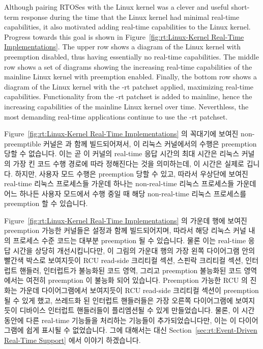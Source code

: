 Although pairing RTOSes with the Linux kernel was a clever and useful
short-term response during the time that the Linux kernel had minimal
real-time capabilities, it also motivated adding real-time capabilities
to the Linux kernel.
Progress towards this goal is shown in
Figure~\ref{fig:rt:Linux-Kernel Real-Time Implementations}.
The upper row shows a diagram of the Linux kernel with preemption disabled,
thus having essentially no real-time capabilities.
The middle row shows a set of diagrams showing the increasing real-time
capabilities of the mainline Linux kernel with preemption enabled.
Finally, the bottom row shows a diagram of the Linux kernel with the
-rt patchset applied, maximizing real-time capabilities.
Functionality from the -rt patchset is added to mainline,
hence the increasing capabilities of the mainline Linux kernel over time.
Neverthless, the most demanding real-time applications continue to use
the -rt patchset.
\fi

Figure~\ref{fig:rt:Linux-Kernel Real-Time Implementations} 의 꼭대기에 보여진
non-preemptible 커널은  과 함께 빌드되어져서, 이 리눅스
커널에서의 수행은 preemption 당할 수 없습니다.
이는 곧 이 커널의 real-time 응답 시간의 최대 시간은 리눅스 커널의 가장 킨 코드
수행 경로에 따라 정해진다는 것을 의미하는데, 이 시간은 실제로 깁니다.
하지만, 사용자 모드 수행은 preemption 당할 수 있고, 따라서 우상단에 보여진
real-time 리눅스 프로세스들 가운데 하나는 non-real-time 리눅스 프로세스들
가운데 어느 하나든 사용자 모드에서 수행 중일 때 해당 non-real-time 리눅스
프로세스를 preemption 할 수 있습니다.

Figure~\ref{fig:rt:Linux-Kernel Real-Time Implementations}
의 가운데 행에 보여진 preemption 가능한 커널들은  설정과
함께 빌드되어지며, 따라서 해당 리눅스 커널 내의 프로세스 수준 코드는 대부분
preemption 될 수 있습니다.
물론 이는 real-time 응답 시간을 상당히 개선시킵니다만, 이 그림의 가운대 행의
가장 왼쪽 다이어그램 안의 빨간색 박스로 보여지듯이 RCU read-side 크리티컬 섹션,
스핀락 크리티컬 섹션, 인터럽트 핸들러, 인터럽트가 불능화된 코드 영역, 그리고
preemption 불능화된 코드 영역에서는 여전히 preemption 이 불능화 되어 있습니다.
Preemption 가능한 RCU 의 진화는 가운데 다이어그램에서 보여지듯이 RCU read-side
크리티컬 섹션이 preemption 될 수 있게 했고, 쓰레드화 된 인터럽트 핸들러들은
가장 오른쪽 다이어그램에 보여지듯이 디바이스 인터럽트 핸들러들이 플리엠션될 수
있게 만들었습니다.
물론, 이 시간 동안에 다른 real-time 기능들을 처리하는 기능들이
추가되었습니다만, 이는 이 다이어그램에 쉽게 표시될 수 없었습니다.
그에 대해서는 대신
Section~\ref{sec:rt:Event-Driven Real-Time Support} 에서 이야기 하겠습니다.
\iffalse

